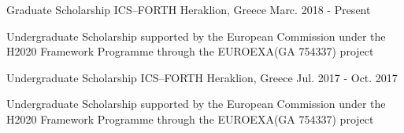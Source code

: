

\begin{cventries}


  \cventry
    {Graduate Scholarship} %
    {ICS--FORTH} %
    {Heraklion, Greece} %
    {Marc. 2018 - Present} %
    {
      \begin{cvitems} %
          \item{Undergraduate Scholarship supported by the European
          Commission under the H2020 Framework Programme through the
          EUROEXA(GA 754337) project}
      \end{cvitems}
    }

  \cventry
    {Undergraduate Scholarship} %
    {ICS--FORTH} %
    {Heraklion, Greece} %
    {Jul. 2017 - Oct. 2017} %
    {
      \begin{cvitems} %
          \item{Undergraduate Scholarship supported by the European
          Commission under the H2020 Framework Programme through the
          EUROEXA(GA 754337) project}
      \end{cvitems}
    }

\end{cventries}
